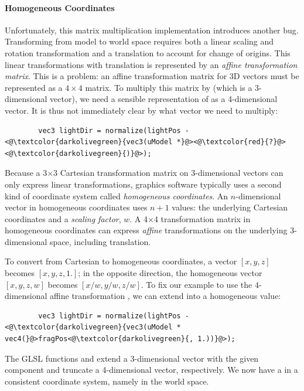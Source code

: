 \documentclass[../main.tex]{subfiles}
\begin{document}
	\paragraph{Homogeneous Coordinates}
	Unfortunately, this matrix multiplication implementation introduces another bug.
	Transforming  from model to world space requires both a linear scaling and rotation transformation and a translation to account for change of origins.
	This linear transformations with translation is represented by an \emph{affine transformation matrix}. 
	This is a problem: an affine transformation matrix for 3D vectors must be represented as a $4\times4$ matrix. To multiply this matrix by  (which is a 3-dimensional vector), we need a sensible representation of  as a 4-dimensional vector.
	It is thus not immediately clear by what vector we need to multiply:
	\begin{lstlisting}
		vec3 lightDir = normalize(lightPos - <@\textcolor{darkolivegreen}{vec3(uModel *}@><@\textcolor{red}{?}@><@\textcolor{darkolivegreen}{)}@>);
	\end{lstlisting}
	Because a 3$\times$3 Cartesian transformation matrix on 3-dimensional vectors can only express linear transformations, graphics software typically uses a second kind of coordinate system called \emph{homogeneous coordinates}.
	An $n$-dimensional vector in homogeneous coordinates uses $n+1$ values: the underlying Cartesian coordinates and a \emph{scaling factor}, $w$.
	A 4$\times$4 transformation matrix in homogeneous coordinates can express \emph{affine} transformations on the underlying 3-dimensional space, including translation.
	
	To convert from Cartesian to homogeneous coordinates, a vector $[x, y, z]$ becomes $[x, y, z, 1.]$;
	in the opposite direction, the homogeneous vector $[x, y, z, w]$ becomes $[x/w, y/w, z/w]$.
	To fix our example to use the 4-dimensional affine transformation , we can extend  into a homogeneous  value:
	\begin{lstlisting}
		vec3 lightDir = normalize(lightPos - <@\textcolor{darkolivegreen}{vec3(uModel * vec4(}@>fragPos<@\textcolor{darkolivegreen}{, 1.))}@>);
	\end{lstlisting}
	The GLSL functions  and  extend a 3-dimensional vector with the given component and truncate a 4-dimensional vector, respectively. We now have a  in a consistent coordinate system, namely in the world space.
	
\end{document}
